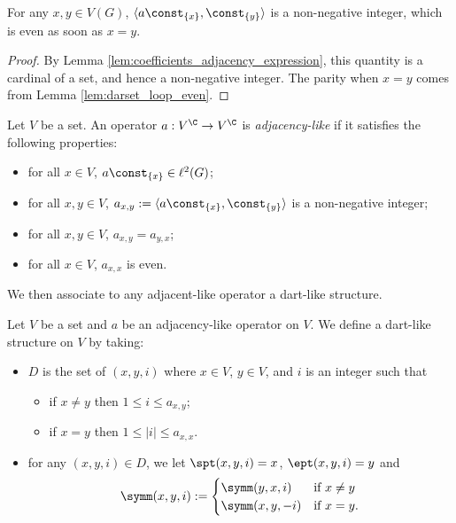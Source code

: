 \begin{lemma}
  \label{lem:coefficients_adjacency_properties}
  For any $x, y \in V(G)$,
  $\langle a \const_{\{x\}}, \const_{\{y\}} \rangle$ is a non-negative integer,
  which is even as soon as $x=y$.
\end{lemma}

\begin{proof}
  By Lemma \ref{lem:coefficients_adjacency_expression}, this quantity is a cardinal
  of a set, and hence a non-negative integer. The parity when $x=y$ comes from Lemma
  \ref{lem:darset_loop_even}.
\end{proof}

\begin{definition}
  \label{def:adjacency_like}
  Let $V$ be a set.
  An operator $a : V^{\C} \rightarrow V^{\C}$ is \emph{adjacency-like}
  if it satisfies the following properties:
  \begin{itemize}
    \item for all $x \in V$, $a \const_{\{x\}} \in \ell^2(G)$;
    \item for all $x, y \in V$,
    $a_{x,y} := \langle a \const_{\{x\}}, \const_{\{y\}} \rangle$ is a non-negative
    integer;
    \item for all $x, y \in V$, $a_{x,y}=a_{y,x}$;
    \item for all $x \in V$, $a_{x,x}$ is even.
  \end{itemize}
\end{definition}

We then associate to any adjacent-like operator a dart-like structure.

\begin{definition}
  \label{def:dartlike_of_adjlike}
  Let $V$ be a set and $a$ be an adjacency-like operator on $V$.
  We define a dart-like structure on $V$ by taking:
  \begin{itemize}
    \item $D$ is the set of $(x,y,i)$ where $x \in V$, $y \in V$, and $i$ is an integer such that
    \begin{itemize}
      \item if $x \neq y$ then $1 \leq i \leq a_{x,y}$;
      \item if $x=y$ then $1 \leq |i| \leq a_{x,x}$.
    \end{itemize}
    \item for any $(x,y,i) \in D$, we let $\spt(x,y,i)=x$, $\ept(x,y,i)=y$ and
    \begin{equation*}
      \symm(x,y,i) := \begin{cases}
        \symm(y,x,i) & \text{if } x \neq y \\
        \symm(x,y,-i) & \text{if } x = y.
      \end{cases}
    \end{equation*}
  \end{itemize}
\end{definition}

